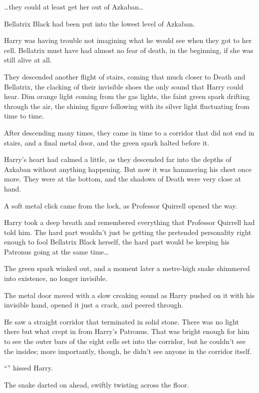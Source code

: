 …they could at least get her out of Azkaban…

Bellatrix Black had been put into the lowest level of Azkaban.

Harry was having trouble not imagining what he would see when they got to her cell. Bellatrix must have had almost no fear of death, in the beginning, if she was still alive at all.

They descended another flight of stairs, coming that much closer to Death and Bellatrix, the clacking of their invisible shoes the only sound that Harry could hear. Dim orange light coming from the gas lights, the faint green spark drifting through the air, the shining figure following with its silver light fluctuating from time to time.

\later

After descending many times, they came in time to a corridor that did not end in stairs, and a final metal door, and the green spark halted before it.

Harry’s heart had calmed a little, as they descended far into the depths of Azkaban without anything happening. But now it was hammering his chest once more. They were at the bottom, and the shadows of Death were very close at hand.

A soft metal click came from the lock, as Professor Quirrell opened the way.

Harry took a deep breath and remembered everything that Professor Quirrell had told him. The hard part wouldn’t just be getting the pretended personality right enough to fool Bellatrix Black herself, the hard part would be keeping his Patronus going at the same time…

The green spark winked out, and a moment later a metre-high snake shimmered into existence, no longer invisible.

The metal door moved with a slow creaking sound as Harry pushed on it with his invisible hand, opened it just a crack, and peered through.

He saw a straight corridor that terminated in solid stone. There was no light there but what crept in from Harry’s Patronus. That was bright enough for him to see the outer bars of the eight cells set into the corridor, but he couldn’t see the insides; more importantly, though, he didn’t see anyone in the corridor itself.

“” hissed Harry.

The snake darted on ahead, swiftly twisting across the floor.

